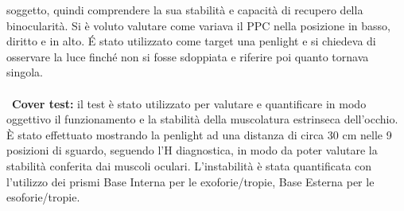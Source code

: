 soggetto, quindi comprendere la sua stabilità e capacità di recupero della binocularità. Si è voluto valutare come
variava il PPC nella posizione in basso, diritto e in alto. É stato utilizzato come target una penlight e si chiedeva di
osservare la luce finché non si fosse sdoppiata e riferire poi quanto tornava singola.
\\\ \\\
\textbf{Cover test:} il test è stato utilizzato per valutare e quantificare in modo oggettivo il funzionamento e la stabilità della
muscolatura estrinseca dell’occhio. È stato effettuato mostrando la penlight ad una distanza di circa 30 cm nelle 9
posizioni di sguardo, seguendo l’H diagnostica, in modo da poter valutare la stabilità conferita dai muscoli oculari.
L’instabilità è stata quantificata con l’utilizzo dei prismi Base Interna per le exoforie/tropie, Base Esterna per le
esoforie/tropie.

